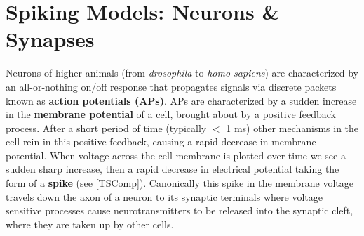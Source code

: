 \chapter{Spiking Models: Neurons \& Synapses}\label{ch_spiking}


Neurons of higher animals (from \emph{drosophila} to \emph{homo sapiens}) are characterized by an all-or-nothing on/off response that propagates signals via discrete packets known as \textbf{action potentials (APs)}. APs are characterized by a sudden increase in the \textbf{membrane potential} of a cell, brought about by a positive feedback process. After a short period of time (typically $<$ 1 ms) other mechanisms in the cell rein in this positive feedback, causing a rapid decrease in membrane potential. When voltage across the cell membrane is plotted over time we see a sudden sharp increase, then a rapid decrease in electrical potential taking the form of a \textbf{spike} (see \ref{TSComp}). Canonically this spike in the membrane voltage travels down the axon of a neuron to its synaptic terminals where voltage sensitive processes cause neurotransmitters to be released into the synaptic cleft, where they are taken up by other cells. 


